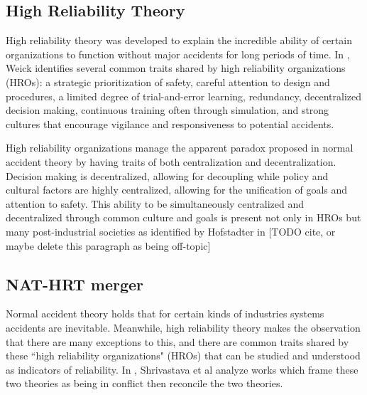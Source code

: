 \documentclass[11pt]{article}
\begin{document}
\subsection{High Reliability Theory}


High reliability theory was developed to explain the incredible ability of certain organizations to
function without major accidents for long periods of time. In \cite{weick1999reliability}, Weick
identifies several common traits shared by high reliability organizations (HROs): a strategic
prioritization of safety, careful attention to design and procedures, a limited degree of
trial-and-error learning, redundancy, decentralized decision making, continuous training often
through simulation, and strong cultures that encourage vigilance and responsiveness to potential
accidents.  

High reliability organizations manage the apparent paradox proposed in normal accident theory by
having traits of both centralization and decentralization. Decision making is decentralized,
allowing for decoupling while policy and cultural factors are highly centralized, allowing for the
unification of goals and attention to safety. This ability to be simultaneously centralized and
decentralized through common culture and goals is present not only in HROs but many post-industrial
societies as identified by Hofstadter in [TODO cite, or maybe delete this paragraph as being
off-topic]

\subsection{NAT-HRT merger}

Normal accident theory holds that for certain kinds of industries systems accidents are inevitable.
Meanwhile, high reliability theory makes the observation that there are many exceptions to this, and
there are common traits shared by these ``high reliability organizations" (HROs) that can be studied
and understood as indicators of reliability. In \cite{shrivastava2009normal}, Shrivastava et al
analyze works which frame these two theories as being in conflict then reconcile the two theories.
\end{document}
